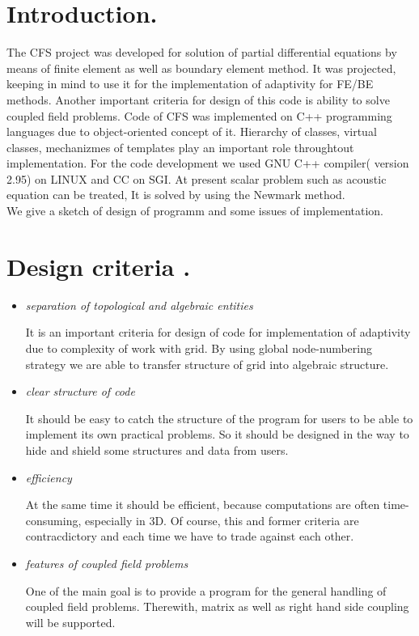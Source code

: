 \section{Introduction.}
%
\begin{print}
 The CFS project was developed for solution of partial differential equations by means of finite element as well as boundary element method. It was projected, keeping in mind to use it for the implementation of adaptivity for FE/BE methods. Another important criteria for design of this code is ability to solve coupled field problems. Code of CFS was implemented on C++ programming languages due to object-oriented concept of it. Hierarchy of classes, virtual classes, mechanizmes of templates play an important role throughtout implementation. For the code development we used GNU C++ compiler( version 2.95)  on LINUX and CC on SGI. At present scalar problem such as acoustic equation can be treated, It is solved by using the Newmark method.\\
 We give a sketch of design of programm and some issues of implementation. 
\end{print}
%
\newslide
%
\section{ Design criteria .}
\begin{itemize}
%
\item{\em separation of topological and algebraic entities}\\
%
\begin{print}
 It is an important criteria for design of code for implementation of adaptivity due to complexity of work with grid. By using global node-numbering strategy we are able to transfer structure of grid into algebraic structure.
\end{print}
%
\item{\em clear structure of code}\\
\begin{print}
 It should be easy to catch the structure of the program for users to be able to implement its own practical problems. So it should be designed in the way to hide and shield some structures and data from users.
\end{print}
%
\item{\em efficiency}\\
\begin{print}
 At the same time it should be efficient, because computations are often time-consuming, especially in 3D. Of course, this and former criteria are contracdictory and each time we have to trade against each other.
\end{print}
%
\item{ \em features of coupled field problems }\\
\begin{print}
 One of the main goal is to provide a program for the general handling of coupled field problems. Therewith, matrix as well as right hand side coupling will be supported.  
\end{print}
\end{itemize}
%
\newslide
%
